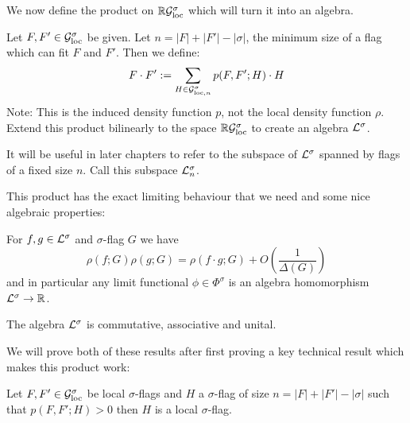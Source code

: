 We now define the product on $\mathbb{R}\mathcal{G}_\mathrm{loc}^\sigma$ which will turn it into an algebra.

\begin{definition}
    Let $F, F'\in\mathcal{G}_\mathrm{loc}^\sigma$ be given. Let $n=|F|+|F'|-|\sigma|$, the minimum size of
    a flag which can fit $F$ and $F'$. Then we define:
    \[
        F \cdot F' := \sum_{H \in \mathcal{G}_{\mathrm{loc},n}^\sigma} p(F, F'; H) \cdot H
    \]
    Note: This is the induced density function $p$, not the local density function $\rho$.
    Extend this product bilinearly to the space $\mathbb{R}\mathcal{G}_\mathrm{loc}^\sigma$ to create an algebra
    $\mathcal{L}^\sigma$.
\end{definition}

\begin{note}
    It will be useful in later chapters to refer to the subspace of $\mathcal{L}^\sigma$
    spanned by flags of a fixed size $n$. Call this subspace $\mathcal{L}^\sigma_n$.
\end{note}

This product has the exact limiting behaviour that we need and some nice algebraic
properties:

\begin{theorem}
    \label{thm:local_product_lim}
    For $f, g \in \mathcal{L}^\sigma$ and $\sigma$-flag $G$ we have
    \[\rho(f; G)\rho(g; G) = \rho(f\cdot g; G) + O\left(\frac{1}{\Delta(G)}\right)\]
    and in particular any limit functional $\phi\in\Phi^\sigma$ is an algebra
    homomorphism $\mathcal{L}^\sigma \to \mathbb{R}$.
\end{theorem}

\begin{lemma}
    \label{lemma:local_assoc}
    The algebra $\mathcal{L}^\sigma$ is commutative, associative and unital.
\end{lemma}

We will prove both of these results after first proving a key technical result which makes this
product work:

\begin{theorem}
    Let $F, F' \in \mathcal{G}_\mathrm{loc}^\sigma$ be local $\sigma$-flags and $H$ a $\sigma$-flag
    of size $n=|F|+|F'|-|\sigma|$ such that $p(F, F'; H) > 0$ then $H$ is a local
    $\sigma$-flag.
\end{theorem}

